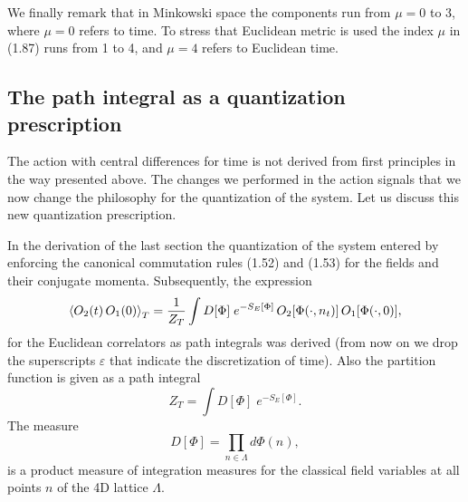 We finally remark that in Minkowski space the components run from $\mu = 0$ to
3, where $\mu = 0$ refers to time. To stress that Euclidean metric is used the
index $\mu$ in (1.87) runs from 1 to 4, and $\mu = 4$ refers to Euclidean time.

\subsection{The path integral as a quantization prescription}

The action with central differences for time is not derived from first
principles in the way presented above. The changes we performed in the action
signals that we now change the philosophy for the quantization of the system.
Let us discuss this new quantization prescription.

In the derivation of the last section the quantization of the system entered by
enforcing the canonical commutation rules (1.52) and (1.53) for the fields and
their conjugate momenta. Subsequently, the expression
\begin{equation}
  \left\langle O_2(t)\,O_1(0) \right\rangle_T = \frac{1}{Z_T}\int D[\Phi]\;e^{-S_E[\Phi]}\,
    O_2[\Phi(\cdot,n_t)]\,O_1[\Phi(\cdot,0)],
\end{equation}
for the Euclidean correlators as path integrals was derived (from now on we
drop the superscripts $\varepsilon$ that indicate the discretization of time).
Also the partition function is given as a path integral
\begin{equation}
  Z_T = \int D[\Phi]\;e^{-S_E[\Phi]}.
\end{equation}
The measure
\begin{equation}
  D[\Phi] = \prod_{n\in\Lambda}d\Phi(n),
\end{equation}
is a product measure of integration measures for the classical field variables
at all points $n$ of the 4D lattice $\Lambda$.

